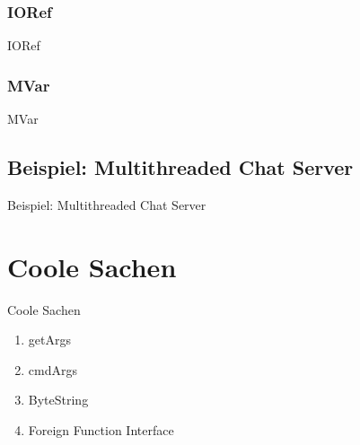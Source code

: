 \documentclass{beamer}
\begin{document}
\subsubsection{IORef}
\begin{frame}{IORef}
\end{frame}

\subsubsection{MVar}
\begin{frame}{MVar}
\end{frame}

\subsection{Beispiel: Multithreaded Chat Server}
\begin{frame}{Beispiel: Multithreaded Chat Server}
\end{frame}

\section{Coole Sachen}
\begin{frame}{Coole Sachen}
\begin{enumerate}
\item getArgs
\item cmdArgs
\item ByteString
\item Foreign Function Interface
\end{enumerate}
\end{frame}
\end{document}
